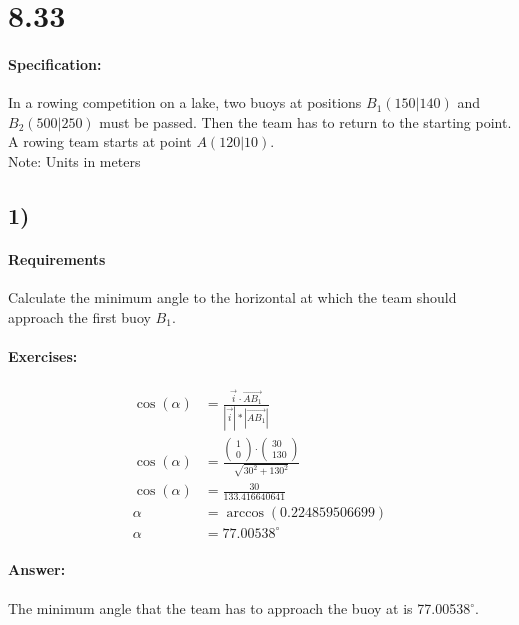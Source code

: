 \section{8.33}
\paragraph{Specification:}
In a rowing competition on a lake, two buoys at positions $B_1(150|140)$ and $B_2(500|250)$ 
must be passed. Then the team has to return to the starting point. A rowing team starts at 
point $A(120|10)$. \\
Note: Units in meters

\subsection{1)}
\paragraph{Requirements}
Calculate the minimum angle to the horizontal at which the team should approach the first 
buoy $B_1$. 


\def\va{\begin{pmatrix}
    30 \\ 
    130
\end{pmatrix}}
\def\vb{\begin{pmatrix}
    350 \\ 
    110
\end{pmatrix}}

\paragraph{Exercises:}
\begin{align}
    \cos(\alpha) &= \frac{\vec{i} \cdot \vec{AB_1}}{|\vec{i}| * |\vec{AB_1}|}  \\
    \cos(\alpha) &= \frac{\begin{pmatrix}
       1 \\ 
       0
    \end{pmatrix} 
    \cdot \va}{\sqrt{30^2 + 130^2}}  \\
    \cos(\alpha) &= \frac{30}{133.416640641} \\
    \alpha &= \arccos(0.224859506699) \\
    \alpha &= 77.00538^\circ
\end{align}

\paragraph{Answer:}
The minimum angle that the team has to approach the buoy at is  77.00538$^\circ$.

